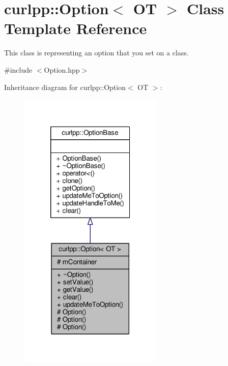 \hypertarget{classcurlpp_1_1Option}{\section{curlpp\-:\-:Option$<$ O\-T $>$ Class Template Reference}
\label{classcurlpp_1_1Option}
}


This class is representing an option that you set on a class.  




{\ttfamily \#include $<$Option.\-hpp$>$}



Inheritance diagram for curlpp\-:\-:Option$<$ O\-T $>$\-:
\nopagebreak
\begin{figure}[H]
\begin{center}
\leavevmode
\includegraphics[width=194pt]{classcurlpp_1_1Option__inherit__graph}
\end{center}
\end{figure}



